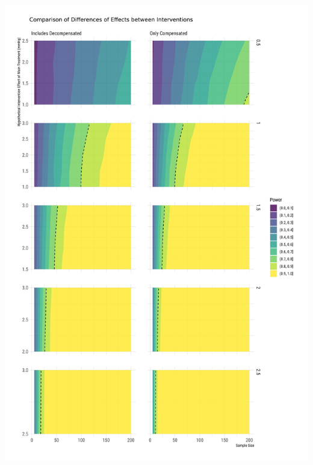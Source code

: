 \documentclass[
]{article}
\begin{document}
\includegraphics{figures/unnamed-chunk-68-2.png}
\end{document}
